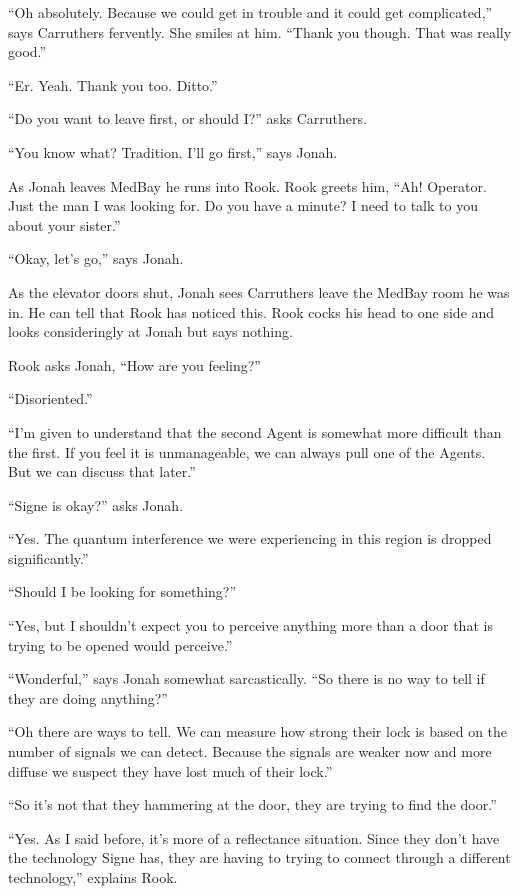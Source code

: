 ``Oh absolutely.  Because we could get in trouble and it could get complicated,'' says Carruthers fervently.  She smiles at him.  ``Thank you though.  That was really good.''

``Er.  Yeah.  Thank you too.  Ditto.''

``Do you want to leave first, or should I?'' asks Carruthers.

``You know what?  Tradition.  I'll go first,'' says Jonah.



As Jonah leaves MedBay he runs into Rook.  Rook greets him, ``Ah!  Operator.  Just the man I was looking for.  Do you have a minute?  I need to talk to you about your sister.''

``Okay, let's go,'' says Jonah.

As the elevator doors shut, Jonah sees Carruthers leave the MedBay room he was in.  He can tell that Rook has noticed this.  Rook cocks his head to one side and looks consideringly at Jonah but says nothing.



Rook asks Jonah, ``How are you feeling?''

``Disoriented.''

``I'm given to understand that the second Agent is somewhat more difficult than the first. If you feel it is unmanageable, we can always pull one of the Agents.  But we can discuss that later.''

``Signe is okay?'' asks Jonah.

``Yes.  The quantum interference we were experiencing in this region is dropped significantly.''

``Should I be looking for something?''

``Yes, but I shouldn't expect you to perceive anything more than a door that is trying to be opened would perceive.''

``Wonderful,'' says Jonah somewhat sarcastically.  ``So there is no way to tell if they are doing anything?''

``Oh there are ways to tell. We can measure how strong their lock is based on the number of signals we can detect.  Because the signals are weaker now and more diffuse we suspect they have lost much of their lock.''

``So it's not that they hammering at the door, they are trying to find the door.''

``Yes.  As I said before, it's more of a reflectance situation.  Since they don't have the technology Signe has, they are having to trying to connect through a different technology,'' explains Rook.

